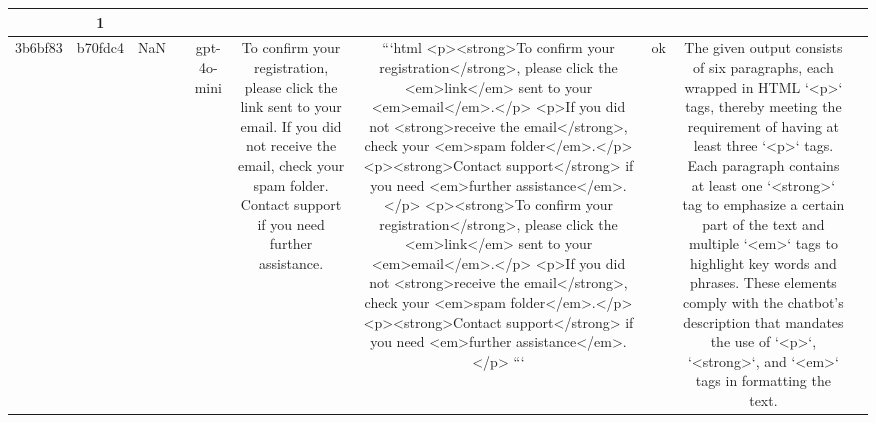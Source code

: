 \begin{table}[h!]
\begin{tabular}{|c|c|c|c|c|c|c|c|c|c|}
{{1. The output contains only three segments surrounded by '<p>' or similar (incorrectly formatted '<p.' and '<p"') tags, which appears to be sentences but two of them are not properly formatted. Instead, some of these segments have incorrect tag formatting (like '<p.' and '<p"'), which violates the requirement that each sentence should be wrapped with a proper '<p>' tag. 

2. The '<strong>' tags in the sentences do not appear to wrap around words or phrases that are part of the '<p>' tagged sentences, thereby failing to adhere to the requirement for a '<strong>' tag within each paragraph. 

3. The requirement for "multiple <em> tags to emphasize key words and phrases" is not consistently applied or appropriately placed within each '<p>' tag. There's an inconsistent usage of '<em>' tags, and some usage of the '<em>' tag appears outside of the expected context.

These formatting issues demonstrate clear violations of the description's directive to properly format sentences with HTML tags, specifically requiring correct '<p>', '<strong>', and '<em>' tag usage within each block. The improper tag formatting disrupts the compliance with the expected HTML formatting standard.

ERR & 1\\
\hline
3b6bf83 & b70fdc4 & NaN &  & gpt-4o-mini & To confirm your registration, please click the link sent to your email. If you did not receive the email, check your spam folder. Contact support if you need further assistance. & ```html
<p><strong>To confirm your registration</strong>, please click the <em>link</em> sent to your <em>email</em>.</p>
<p>If you did not <strong>receive the email</strong>, check your <em>spam folder</em>.</p>
<p><strong>Contact support</strong> if you need <em>further assistance</em>.</p>
<p><strong>To confirm your registration</strong>, please click the <em>link</em> sent to your <em>email</em>.</p>
<p>If you did not <strong>receive the email</strong>, check your <em>spam folder</em>.</p>
<p><strong>Contact support</strong> if you need <em>further assistance</em>.</p>
``` & ok & The given output consists of six paragraphs, each wrapped in HTML `<p>` tags, thereby meeting the requirement of having at least three `<p>` tags. Each paragraph contains at least one `<strong>` tag to emphasize a certain part of the text and multiple `<em>` tags to highlight key words and phrases. These elements comply with the chatbot's description that mandates the use of `<p>`, `<strong>`, and `<em>` tags in formatting the text.

}}
\end{tabular}
\end{table}
